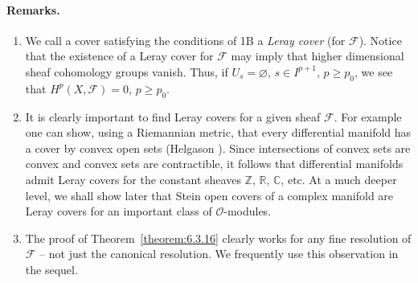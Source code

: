 \paragraph{Remarks.}
\begin{enumerate}
\item We call a cover satisfying the conditions of 1B a \emph{Leray cover} (for $\mathcal F$). Notice that the existence of a Leray cover for $\mathcal F$ may imply that higher dimensional sheaf cohomology groups vanish. Thus, if $U_s=\varnothing$, $s\in I^{p+1}$, $p\geq p_0$, we see that $H^p(X,\mathcal F)=0$, $p\geq p_0$.
\item It is clearly important to find Leray covers for a given sheaf $\mathcal F$. For example one can show, using a Riemannian metric, that every differential manifold has a cover by convex open sets (Helgason \cite[page 54]{bib:II:helgason-s:1}). Since intersections of convex sets are convex and convex sets are contractible, it follows that differential manifolds admit Leray covers for the constant sheaves $\mathbb Z$, $\mathbb R$, $\mathbb C$, etc. At a much deeper level, we shall show later that Stein open covers of a complex manifold are Leray covers for an important class of $\mathcal O$-modules.
\item The proof of Theorem~\ref{theorem:6.3.16} clearly works for any fine resolution of $\mathcal F$ -- not just the canonical resolution. We frequently use this observation in the sequel.
\end{enumerate}
